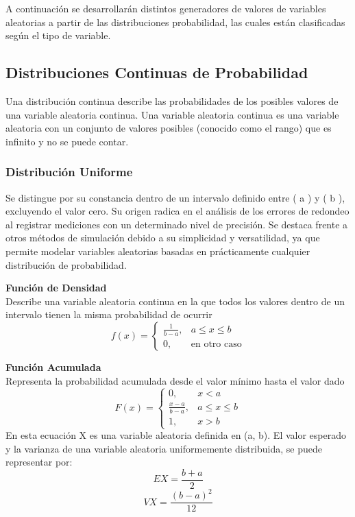 \documentclass[11pt]{article}
\begin{document}
A continuación se desarrollarán distintos generadores de valores de variables aleatorias a partir de las distribuciones probabilidad, las cuales están clasificadas según el tipo de variable.


\subsection{Distribuciones Continuas de Probabilidad}
  Una distribución continua describe las probabilidades de los posibles valores de una variable aleatoria continua. Una variable aleatoria continua es una variable aleatoria con un conjunto de valores posibles (conocido como el rango) que es infinito y no se puede contar.

\subsubsection{Distribución Uniforme}
  Se distingue por su constancia dentro de un intervalo definido entre ( a ) y ( b ), excluyendo el valor cero. Su origen radica en el análisis de los errores de redondeo al registrar mediciones con un determinado nivel de precisión. Se destaca frente a otros métodos de simulación debido a su simplicidad y versatilidad, ya que permite modelar variables aleatorias basadas en prácticamente cualquier distribución de probabilidad.


\noindent\textbf{Función de Densidad}\\
Describe una variable aleatoria continua en la que todos los valores dentro de un intervalo tienen la misma probabilidad de ocurrir
\[
f(x) = 
\begin{cases}
\frac{1}{b - a}, & a \leq x \leq b \\
0, & \text{en otro caso}
\end{cases}
\]

\noindent\textbf{Función Acumulada}\\
Representa la probabilidad acumulada desde el valor mínimo hasta el valor dado
\[
F(x) = 
\begin{cases}
0, & x < a \\
\frac{x - a}{b - a}, & a \leq x \leq b \\
1, & x > b
\end{cases}
\]
En esta ecuación  X es una variable aleatoria definida en (a, b). El valor esperado y la varianza de una variable aleatoria uniformemente distribuida, se puede representar por:
  \begin{equation}
    EX = \frac{b+a}{2}
  \end{equation}
  \begin{equation}
    VX = \frac{(b-a)^2}{12}
  \end{equation}
\end{document}
